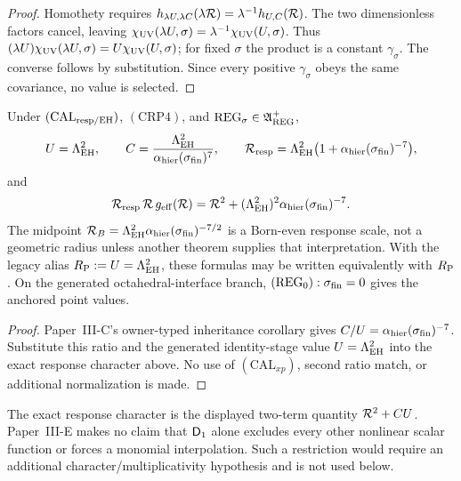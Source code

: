 \documentclass[12pt,a4paper]{article}
\begin{document}
\begin{proof}
Homothety requires
\(h_{\lambda U,\lambda C}(\lambda\mathcal R)=\lambda^{-1}h_{U,C}(\mathcal R)\).
The two dimensionless factors cancel, leaving
\(\chi_{\rm UV}(\lambda U,\sigma)=\lambda^{-1}
\chi_{\rm UV}(U,\sigma)\).  Thus
\((\lambda U)\chi_{\rm UV}(\lambda U,\sigma)
=U\chi_{\rm UV}(U,\sigma)\); for fixed \(\sigma\) the product is a constant
\(\gamma_\sigma\).  The converse follows by substitution.  Since every
positive \(\gamma_\sigma\) obeys the same covariance, no value is selected.
\end{proof}

\begin{corollary}
\label{p3:lem:curvature-transport-character}
Under \((\mathrm{CAL}_{\rm resp/EH})\), \((\mathrm{CRP4})\), and
\(\mathrm{REG}_{\sigma}\in\mathfrak A_{\rm REG}^{+}\),
\[
 U=\Lambda_{\rm EH}^2,\qquad
 C=\frac{\Lambda_{\rm EH}^2}
 {\alpha_{\rm hier}(\sigma_{\rm fin})^{7}},\qquad
 \mathcal R_{\rm resp}=\Lambda_{\rm EH}^2
 \bigl(1+\alpha_{\rm hier}(\sigma_{\rm fin})^{-7}\bigr),
\]
and
\[
 \mathcal R_{\rm resp}\,\mathcal R\,g_{\rm eff}(\mathcal R)
 =\mathcal R^2+(\Lambda_{\rm EH}^2)^2
 \alpha_{\rm hier}(\sigma_{\rm fin})^{-7}.
\]
The midpoint
\(\mathcal R_B=\Lambda_{\rm EH}^2
\alpha_{\rm hier}(\sigma_{\rm fin})^{-7/2}\) is a Born-even response scale,
not a geometric radius unless another theorem supplies that interpretation.
With the legacy alias \(R_{\mathrm P}:=U=\Lambda_{\rm EH}^2\), these formulas may be
written equivalently with \(R_{\mathrm P}\).
On the generated octahedral-interface branch,
\((\mathrm{REG}_0):\sigma_{\rm fin}=0\) gives the anchored point values.
\end{corollary}

\begin{proof}
Paper~III-C's owner-typed inheritance corollary gives
\(C/U=\alpha_{\rm hier}(\sigma_{\rm fin})^{-7}\).  Substitute this ratio and
the generated identity-stage value \(U=\Lambda_{\rm EH}^2\) into the exact
response character above.  No use of \((\mathrm{CAL}_{xp})\), second ratio
match, or additional normalization is made.
\end{proof}

\begin{remark}
\label{p3:lem:homogeneous-running-monomial}
The exact response character is the displayed two-term quantity
\(\mathcal R^2+CU\).  Paper~III-E makes no claim that \(\mathsf{D}_1\) alone excludes
every other nonlinear scalar function or forces a monomial interpolation.
Such a restriction would require an additional character/multiplicativity
hypothesis and is not used below.
\end{remark}
\end{document}
